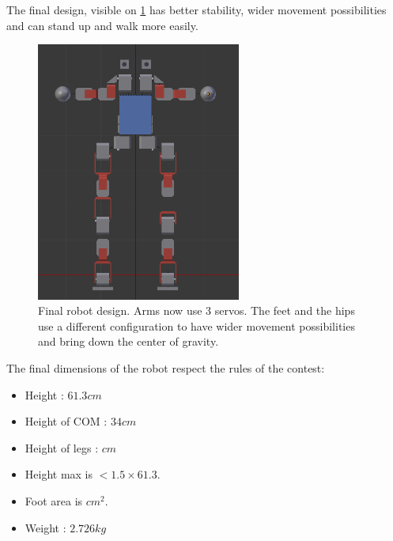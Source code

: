 The final design, visible on \cref{fig:final_robot} has better stability, wider movement possibilities and can stand up and walk more easily. 
\begin{figure}[htp]
\center
\includegraphics[width=0.6\textwidth]{figures/robot2}
\caption[Final robot design]{Final robot design. Arms now use 3 servos. The feet and the hips use a different configuration to have wider movement possibilities and bring down the center of gravity.}
\label{fig:final_robot}
\end{figure}

The final dimensions of the robot respect the rules of the contest:
\begin{itemize}
\item Height : $61.3cm$
\item Height of COM : $34cm$
\item Height of legs : $cm$
\item Height max is $< 1.5 \times 61.3$.
\item Foot area is $ cm^2$.
\item Weight : $2.726kg$
\end{itemize}